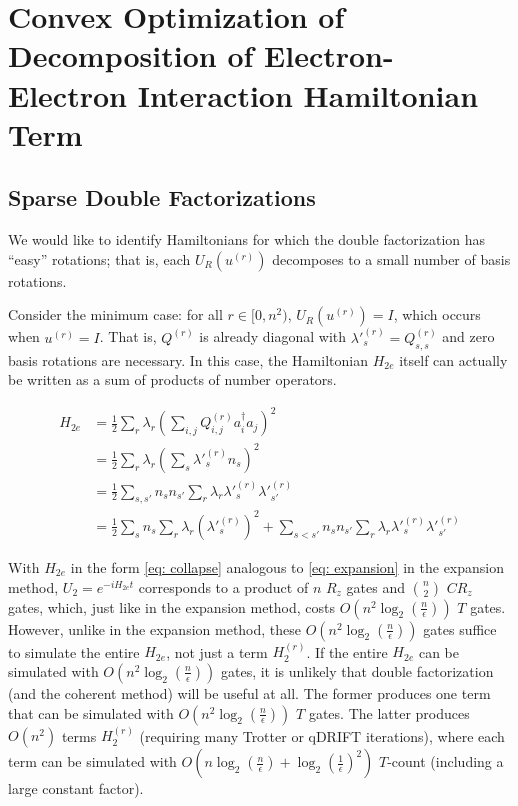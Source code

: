 

\chapter{Convex Optimization of Decomposition of Electron-Electron Interaction Hamiltonian Term}

\section{Sparse Double Factorizations}

We would like to identify Hamiltonians for which the double factorization has ``easy'' rotations; that is, each $U_R(u^{(r)})$ decomposes to a small number of basis rotations.

Consider the minimum case: for all $r \in [0, n^2)$, $U_R(u^{(r)}) = I$, which occurs when $u^{(r)} = I$. That is, $Q^{(r)}$ is already diagonal with $\lambda'^{(r)}_s = Q^{(r)}_{s, s}$ and zero basis rotations are necessary. In this case, the Hamiltonian $H_{2e}$ itself can actually be written as a sum of products of number operators. 

\begin{equation}
    \begin{split}
        H_{2e} &= \frac{1}{2}\sum_r\lambda_r\left(\sum_{i,j} Q^{(r)}_{i, j}a^\dag_ia_j\right)^2 \\
        &= \frac{1}{2}\sum_r\lambda_r(\sum_{s} \lambda'^{(r)}_sn_s)^2 \\
        &= \frac{1}{2}\sum_{s, s'} n_sn_{s'}\sum_r\lambda_r\lambda'^{(r)}_s\lambda'^{(r)}_{s'} \\
        &= \frac{1}{2}\sum_s n_s\sum_r\lambda_r(\lambda'^{(r)}_s)^2 + \sum_{s < s'} n_sn_{s'}\sum_r\lambda_r\lambda'^{(r)}_s\lambda'^{(r)}_{s'} \label{eq: collapse}
    \end{split}
\end{equation}

With $H_{2e}$ in the form \eqref{eq: collapse} analogous to \eqref{eq: expansion} in the expansion method, $U_2 = e^{-iH_{2e}t}$ corresponds to a product of $n$ $R_z$ gates and ${n \choose 2}$ $CR_z$ gates, which, just like in the expansion method, costs $O(n^2\log_2(\frac{n}{\epsilon}))$ $T$ gates. However, unlike in the expansion method, these $O(n^2\log_2(\frac{n}{\epsilon}))$ gates suffice to simulate the entire $H_{2e}$, not just a term $H_2^{(r)}$. If the entire $H_{2e}$ can be simulated with $O(n^2\log_2(\frac{n}{\epsilon}))$ gates, it is unlikely that double factorization (and the coherent method) will be useful at all. The former produces one term that can be simulated with $O(n^2\log_2(\frac{n}{\epsilon}))$ $T$ gates. The latter produces $O(n^2)$ terms $H_2^{(r)}$ (requiring many Trotter or qDRIFT iterations), where each term can be simulated with $O(n\log_2(\frac{n}{\epsilon}) + \log_2(\frac{1}{\epsilon})^2)$ $T$-count (including a large constant factor).

